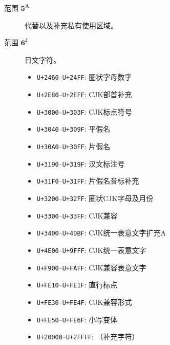\documentclass{ltjarticle}
\begin{document}
\begin{description}
\item[范围 $\mathbf{5^A}$] 代替以及补充私有使用区域。
\item[范围 $\mathbf{6^J}$] 日文字符。
\begin{multicols}{2}
	\begin{itemize}
	\item \texttt{U+2460}--\texttt{U+24FF}: 圈状字母数字
	\item \texttt{U+2E80}--\texttt{U+2EFF}: CJK部首补充
	\item \texttt{U+3000}--\texttt{U+303F}: CJK标点符号
	\item \texttt{U+3040}--\texttt{U+309F}: 平假名
	\item \texttt{U+30A0}--\texttt{U+30FF}: 片假名
	\item \texttt{U+3190}--\texttt{U+319F}: 汉文标注号
	\item \texttt{U+31F0}--\texttt{U+31FF}: 片假名音标补充
	\item \texttt{U+3200}--\texttt{U+32FF}: 圈状CJK字母及月份
	\item \texttt{U+3300}--\texttt{U+33FF}: CJK兼容
	\item \texttt{U+3400}--\texttt{U+4DBF}: CJK统一表意文字扩充A		\item \texttt{U+4E00}--\texttt{U+9FFF}: CJK统一表意文字
	\item \texttt{U+F900}--\texttt{U+FAFF}: CJK兼容表意文字
	\item \texttt{U+FE10}--\texttt{U+FE1F}: 直行标点
	\item \texttt{U+FE30}--\texttt{U+FE4F}: CJK兼容形式
	\item \texttt{U+FE50}--\texttt{U+FE6F}: 小写变体
	\item \texttt{U+20000}--\texttt{U+2FFFF}: （补充字符）
	\end{itemize}
\end{multicols}


\end{description}
\end{document}
